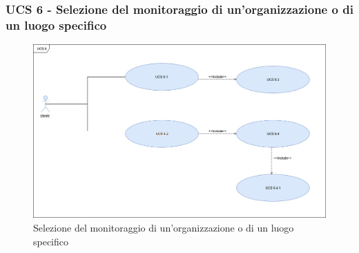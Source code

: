 \newpage

\subsubsection{UCS 6 - Selezione del monitoraggio di un'organizzazione o di un luogo specifico}%

\begin{figure}[h]
\centering
\includegraphics[scale=0.3]{sezioni/UseCase/Immagini/UCS6.png}
\caption{Selezione del monitoraggio di un'organizzazione o di un luogo specifico}
\end{figure}

